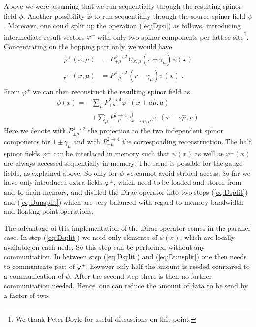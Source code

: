 Above we were assuming that we run sequentially through the resulting
spinor field $\phi$. Another possibility is to run sequentially
through the source spinor field $\psi$. Moreover, one could split up
the operation (\ref{eq:Dpsi}) as follows, introducing intermediate
result vectors $\varphi^\pm$ with only two spinor components per lattice
site\footnote{We thank Peter Boyle for useful discussions on this
  point.}. Concentrating on the hopping part only, we would have 
\begin{equation}
  \label{eq:Dsplit}
  \begin{split}
    \varphi^+(x, \mu) &= P_{+\mu}^{4\to2}\ U_{x,\mu}(r+\gamma_\mu) \psi(x) \\
    \varphi^-(x, \mu) &= P_{-\mu}^{4\to2}\ (r-\gamma_\mu) \psi(x)\; . \\
  \end{split}
\end{equation}
From $\varphi^\pm$ we can then reconstruct the resulting spinor field 
as
\begin{equation}
  \label{eq:Dunsplit}
  \begin{split}
    \phi(x) =& \sum_\mu P_{+\mu}^{2\to4}\varphi^+(x+a\hat\mu,\mu) \\
    & + \sum_\mu P_{-\mu}^{2\to4}U^\dagger_{x-a\hat\mu,\mu}\varphi^-(x-a\hat\mu,\mu)
  \end{split}
\end{equation}
Here we denote with $P_{\pm\mu}^{4\to2}$ the projection to the two
independent spinor components for $1\pm\gamma_\mu$ and with
$P_{\pm\mu}^{2\to4}$ the corresponding reconstruction.
The half spinor fields $\varphi^\pm$ can be interlaced in
memory such that $\psi(x)$ as well as $\varphi^\pm(x)$ are always
accessed sequentially in memory. The same is possible for the gauge
fields, as explained above. So only for $\phi$ we cannot avoid strided
access. So far we have only introduced extra fields $\varphi^\pm$,
which need to be loaded and stored from and to main memory, and
divided the Dirac operator into two steps (\ref{eq:Dsplit}) and
(\ref{eq:Dunsplit}) which are very balanced with regard to memory
bandwidth and floating point operations.

The advantage of this implementation of the Dirac operator comes
in the parallel case. In step (\ref{eq:Dsplit}) we need only elements
of $\psi(x)$, which are locally available on each node. So this step
can be performed without 
any communication. In between step (\ref{eq:Dsplit}) and
(\ref{eq:Dunsplit}) one then needs to communicate part of
$\varphi^\pm$, however only half the amount is needed compared to a
communication of $\psi$. After the second step there is then no
further communication needed. Hence, one can reduce the amount of data
to be send by a factor of two. 

